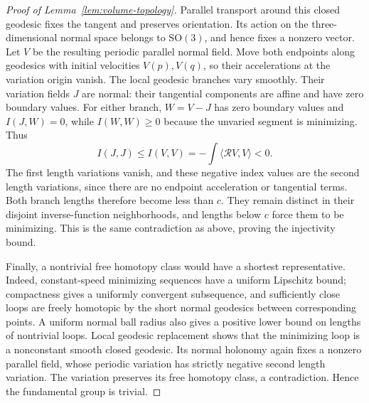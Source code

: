 \begin{proof}[Proof of Lemma~\ref{lem:volume-topology}]
Parallel transport around this closed geodesic fixes the tangent and
preserves orientation.  Its action on the three-dimensional normal
space belongs to $\mathrm{SO}(3)$, and hence fixes a nonzero vector.
Let $V$ be the resulting periodic parallel normal field.  Move both
endpoints along geodesics with initial velocities $V(p),V(q)$, so their
accelerations at the variation origin vanish.  The local geodesic
branches vary smoothly.  Their variation fields $J$ are normal: their
tangential components are affine and have zero boundary values.
For either branch, $W=V-J$ has zero boundary values and
$I(J,W)=0$, while $I(W,W)\ge0$ because the unvaried segment is minimizing.
Thus
\[
 I(J,J)\le I(V,V)=-\int\langle\mathcal RV,V\rangle<0.
\]
The first length variations vanish, and these negative index values
are the second length variations, since there are no endpoint
acceleration or tangential terms.  Both branch lengths therefore become
less than $c$.  They remain distinct in their disjoint inverse-function
neighborhoods, and lengths below $c$ force them to be minimizing.  This
is the same contradiction as above, proving the injectivity bound.

Finally, a nontrivial free homotopy class would have a shortest
representative.  Indeed, constant-speed minimizing sequences have a
uniform Lipschitz bound; compactness gives a uniformly convergent
subsequence, and sufficiently close loops are freely homotopic by the
short normal geodesics between corresponding points.  A uniform normal
ball radius also gives a positive lower bound on lengths of nontrivial
loops.  Local geodesic replacement shows that the minimizing loop is
a nonconstant smooth closed geodesic.  Its normal holonomy again fixes
a nonzero parallel field, whose periodic variation has strictly
negative second length variation.  The variation preserves its free
homotopy class, a contradiction.  Hence the fundamental group is
trivial.
\end{proof}
